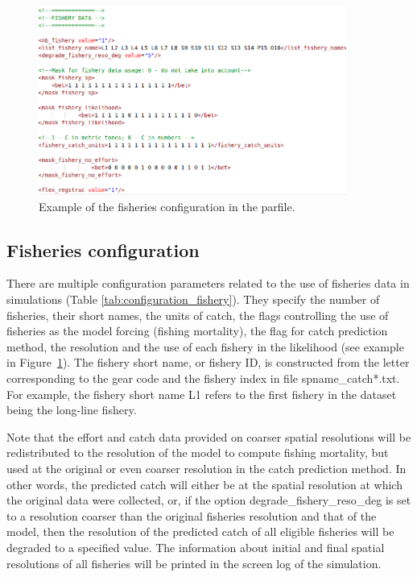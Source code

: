  \begin{figure}[t]
   \centering
    \vbox{
    \includegraphics[width=0.9\textwidth]{chapter3/figs/fishery_data_1.png}}
   \caption{Example of the fisheries configuration in the parfile. }
    \label{fig:fisheries_parfile}
 \end{figure}

\subsection{Fisheries configuration} \label{sec:config-fisheries}

There are multiple configuration parameters related to the use of fisheries data in simulations (Table \ref{tab:configuration_fishery}). They specify the number of fisheries, their short names, the units of catch, the flags controlling the use of fisheries as the model forcing (fishing mortality), the flag for catch prediction method, the resolution and the use of each fishery in the likelihood (see example in Figure~\ref{fig:fisheries_parfile}). The fishery short name, or fishery ID, is constructed from the letter corresponding to the gear code and the fishery index in file spname\_catch*.txt. For example, the fishery short name {\ttfamily L1} refers to the first fishery in the dataset being the long-line fishery. 

Note that the effort and catch data provided on coarser spatial resolutions will be redistributed to the resolution of the model to compute fishing mortality, but used at the original or even coarser resolution in the catch prediction method. In other words, the predicted catch will either be at the spatial resolution at which the original data were collected, or, if the option {\ttfamily degrade\_fishery\_reso\_deg} is set to a resolution coarser than the original fisheries resolution and that of the model, then the resolution of the predicted catch of all eligible fisheries will be degraded to a specified value. The information about initial and final spatial resolutions of all fisheries will be printed in the screen log of the simulation. \\


